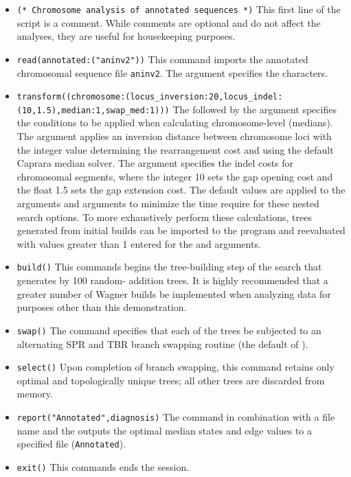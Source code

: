 \begin{itemize}
\item \texttt{(* Chromosome analysis of annotated sequences  *)} This first line of the script is a comment. While 
comments are optional and do not affect the analyses, they are useful for housekeeping purposes.
\item \texttt{read(annotated:("aninv2"))} This command imports the annotated chromosomal sequence file 
\texttt{aninv2}. The argument  specifies the characters. 
\item \texttt{transform((chromosome:(locus\_inversion:20,locus\_indel:\\(10,1.5),median:1,swap\_med:1)))}  The 
 follow\-ed by the argument  specifies the conditions to be 
applied when calculating chromosome-level (medians).  The argument  applies 
an inversion distance between chromosome loci with the integer value determining the rearrangement cost and 
using the default Caprara median solver. The argument  specifies the indel costs 
for chromosomal segments, where the integer 10 sets the gap opening cost and the float 1.5 sets the gap extension 
cost.  The default values are applied to the arguments    and 
 arguments to minimize the time require for these nested search options.   To more 
exhaustively perform these calculations, trees generated from initial builds can be imported to the program and 
reevaluated with values greater than 1 entered for the  and  
arguments.
\item \texttt{build()} This commands begins the tree-building step of the search that generates by 100 random-
addition trees.  It is highly recommended that a greater number of Wagner builds be implemented when analyzing 
data for purposes other than this demonstration.
\item \texttt{swap()} The  command specifies that each of the trees be subjected to an alternating 
SPR and TBR branch swapping routine (the default of \poy).
\item \texttt{select()} Upon completion of branch swapping, this command retains only optimal and topologically 
unique trees; all other trees are discarded from memory. 
\item \texttt{report("Annotated",diagnosis)}  The  command in combination with a file name and 
the  outputs the optimal median states and edge values to a specified file 
(\texttt{Annotated}). 
\item \texttt{exit()} This commands ends the \poy session.
\end{itemize}

